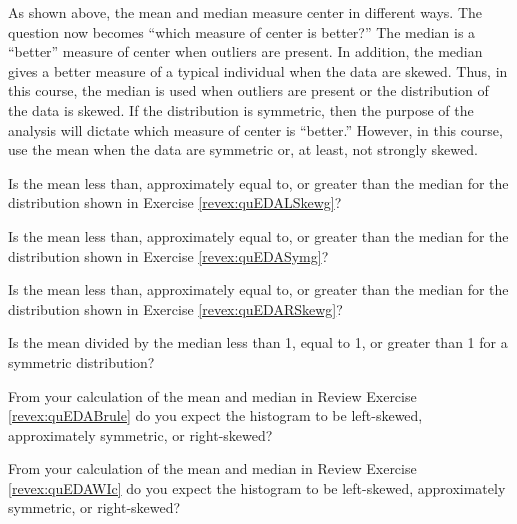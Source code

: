 
\vspace{-12pt}

As shown above, the mean and median measure center in different ways. The question now becomes ``which measure of center is better?''  The median is a ``better'' measure of center when outliers are present. In addition, the median gives a better measure of a typical individual when the data are skewed. Thus, in this course, the median is used when outliers are present or the distribution of the data is skewed.  If the distribution is symmetric, then the purpose of the analysis will dictate which measure of center is ``better.''  However, in this course, use the mean when the data are symmetric or, at least, not strongly skewed.


\vspace{-12pt}
\begin{exsection}
  \item \label{revex:quEDALSkewMM}Is the mean less than, approximately equal to, or greater than the median for the distribution shown in Exercise \ref{revex:quEDALSkewg}? 
  \item \label{revex:quEDAAsymMM}Is the mean less than, approximately equal to, or greater than the median for the distribution shown in Exercise \ref{revex:quEDASymg}? 
  \item \label{revex:quEDARSkewMM}Is the mean less than, approximately equal to, or greater than the median for the distribution shown in Exercise \ref{revex:quEDARSkewg}? 
  \item \label{revex:quEDARatio} Is the mean divided by the median less than 1, equal to 1, or greater than 1 for a symmetric distribution? 
  \item \label{revex:quEDABruleMM} From your calculation of the mean and median in Review Exercise  \ref{revex:quEDABrule} do you expect the histogram to be left-skewed, approximately symmetric, or right-skewed? 
  \item \label{revex:quEDAWIcMM} From your calculation of the mean and median in Review Exercise \ref{revex:quEDAWIc} do you expect the histogram to be left-skewed, approximately symmetric, or right-skewed? 
\end{exsection}



